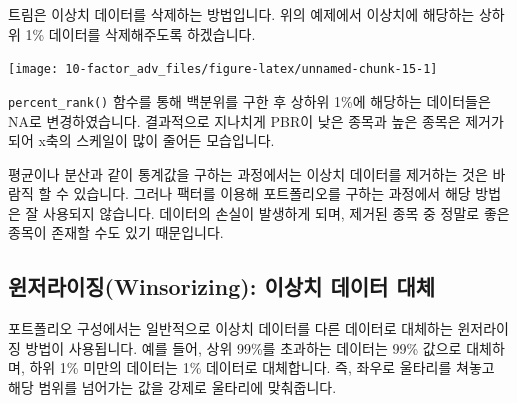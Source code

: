\documentclass[12pt,]{book}
\newenvironment{Shaded}{\begin{snugshade}}{\end{snugshade}}
\newcommand{\DataTypeTok}[1]{\textcolor[rgb]{0.13,0.29,0.53}{#1}}
\newcommand{\FloatTok}[1]{\textcolor[rgb]{0.00,0.00,0.81}{#1}}
\newcommand{\KeywordTok}[1]{\textcolor[rgb]{0.13,0.29,0.53}{\textbf{#1}}}
\newcommand{\NormalTok}[1]{#1}
\newcommand{\OperatorTok}[1]{\textcolor[rgb]{0.81,0.36,0.00}{\textbf{#1}}}
\newcommand{\OtherTok}[1]{\textcolor[rgb]{0.56,0.35,0.01}{#1}}
\newcommand{\StringTok}[1]{\textcolor[rgb]{0.31,0.60,0.02}{#1}}
\begin{document}
트림은 이상치 데이터를 삭제하는 방법입니다. 위의 예제에서 이상치에 해당하는 상하위 1\% 데이터를 삭제해주도록 하겠습니다.

\begin{Shaded}
\end{Shaded}

\begin{center}\texttt{[image: 10-factor\_adv\_files/figure-latex/unnamed-chunk-15-1]} \end{center}

\texttt{percent\_rank()} 함수를 통해 백분위를 구한 후 상하위 1\%에 해당하는 데이터들은 NA로 변경하였습니다. 결과적으로 지나치게 PBR이 낮은 종목과 높은 종목은 제거가 되어 x축의 스케일이 많이 줄어든 모습입니다.

평균이나 분산과 같이 통계값을 구하는 과정에서는 이상치 데이터를 제거하는 것은 바람직 할 수 있습니다. 그러나 팩터를 이용해 포트폴리오를 구하는 과정에서 해당 방법은 잘 사용되지 않습니다. 데이터의 손실이 발생하게 되며, 제거된 종목 중 정말로 좋은 종목이 존재할 수도 있기 때문입니다.

\hypertarget{winsorizing---}{%
\subsection{윈저라이징(Winsorizing): 이상치 데이터 대체}\label{winsorizing---}}

포트폴리오 구성에서는 일반적으로 이상치 데이터를 다른 데이터로 대체하는 윈저라이징 방법이 사용됩니다. 예를 들어, 상위 99\%를 초과하는 데이터는 99\% 값으로 대체하며, 하위 1\% 미만의 데이터는 1\% 데이터로 대체합니다. 즉, 좌우로 울타리를 쳐놓고 해당 범위를 넘어가는 값을 강제로 울타리에 맞춰줍니다.
\end{document}
